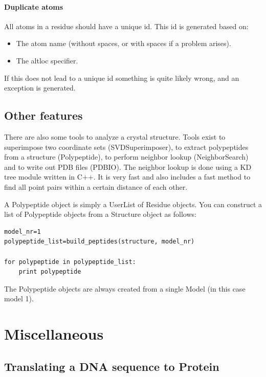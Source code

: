 \documentclass{report}
\begin{document}
\paragraph{Duplicate atoms}

All atoms in a residue should have a unique id. This id is generated based on:

\begin{itemize}
\item The atom name (without spaces, or with spaces if a problem arises).
\item The altloc specifier.
\end{itemize}
If this does not lead to a unique id something is quite likely wrong, and an
exception is generated.

\subsection{Other features}

There are also some tools to analyze a crystal structure. Tools
exist to superimpose two coordinate sets (SVDSuperimposer), to extract 
polypeptides from a structure (Polypeptide), to perform neighbor lookup
(NeighborSearch) and to write out PDB files (PDBIO). The neighbor lookup
is done using a KD tree module written in C++. It is very fast and also
includes a fast method to find all point pairs within a certain distance 
of each other.

A Polypeptide object is simply a UserList of Residue objects. You can 
construct a list of Polypeptide objects from a Structure object as follows:

\begin{verbatim}
model_nr=1
polypeptide_list=build_peptides(structure, model_nr)

for polypeptide in polypeptide_list:
    print polypeptide
\end{verbatim}

The Polypeptide objects are always created from a single 
Model (in this case model 1).

\section{Miscellaneous}

\subsection{Translating a DNA sequence to Protein}
\end{document}
